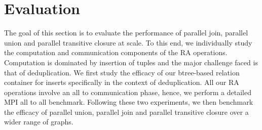 

\section{Evaluation}
\label{sec:eval}

The goal of this section is to evaluate the performance of parallel join, parallel union and parallel transitive closure at scale.
To this end, we individually study the computation and communication components of the RA operations.
Computation is dominated by insertion of tuples and the major challenge faced is that of deduplication.
We first study the efficacy of our btree-based relation container for inserts specifically in the context of deduplication.
All our RA operations involve an all to communication phase, hence, we perform a detailed MPI all to all benchmark.
Following these two experiments, we then benchmark the efficacy of parallel union, parallel join and parallel transitive closure over a wider range of graphs.




